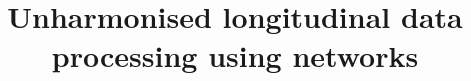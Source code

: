 \documentclass[10pt,letterpaper]{article}
\begin{document}


\doublespacing
\title{Unharmonised longitudinal data processing using networks}
\author{}

\maketitle






\end{document}
